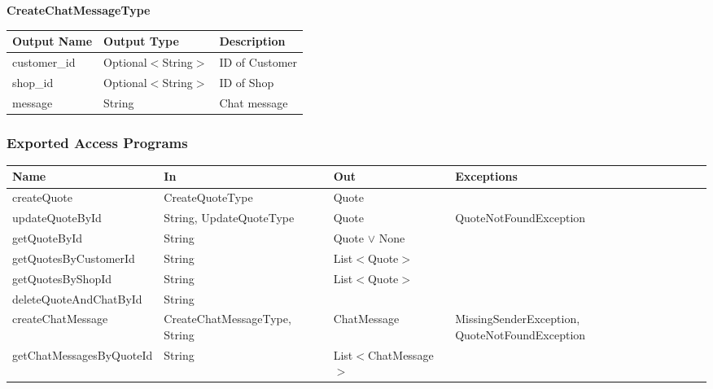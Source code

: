 \documentclass[12pt, titlepage]{article}
\begin{document}
\textbf{CreateChatMessageType}

\begin{table}[H]
	\begin{tabular}{|p{}|p{}|p{}|}
		\hline
		\textbf{Output Name} & \textbf{Output Type} & \textbf{Description} \\
		\hline
		customer\_id         & Optional$<$String$>$ & ID of Customer       \\
		\hline
		shop\_id             & Optional$<$String$>$ & ID of Shop           \\
		\hline
		message              & String               & Chat message         \\
		\hline
	\end{tabular}
\end{table}

\subsubsection{Exported Access Programs}

\begin{center}
	\begin{adjustbox}{width=\textwidth}
		\begin{tabular}{llll}
			\hline
			\textbf{Name}            & \textbf{In}                   & \textbf{Out}          & \textbf{Exceptions}                            \\
			\hline
			createQuote              & CreateQuoteType               & Quote                 & ~                                              \\
			updateQuoteById          & String, UpdateQuoteType       & Quote                 & QuoteNotFoundException                         \\
			getQuoteById             & String                        & Quote $\lor$ None     & ~                                              \\
			getQuotesByCustomerId    & String                        & List$<$Quote$>$       & ~                                              \\
			getQuotesByShopId        & String                        & List$<$Quote$>$       & ~                                              \\
			deleteQuoteAndChatById   & String                        & ~                     & ~                                              \\
			createChatMessage        & CreateChatMessageType, String & ChatMessage           & MissingSenderException, QuoteNotFoundException \\
			getChatMessagesByQuoteId & String                        & List$<$ChatMessage$>$ & ~                                              \\
			\hline
		\end{tabular}
	\end{adjustbox}
\end{center}
\end{document}
